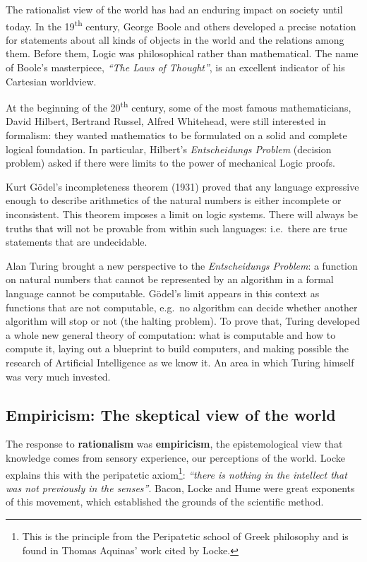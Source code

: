 The rationalist view of the world has had an enduring impact on society until today. In the 19\textsuperscript{th} century, George Boole and others developed a precise notation for statements about all kinds of objects in the world and the relations among them. Before them, Logic was philosophical rather than mathematical. The name of Boole's masterpiece, \emph{``The Laws of Thought''}, is an excellent indicator of his Cartesian worldview.

At the beginning of the 20\textsuperscript{th} century, some of the most famous mathematicians, David Hilbert, Bertrand Russel, Alfred Whitehead, were still interested in formalism: they wanted mathematics to be formulated on a solid and complete logical foundation. In particular, Hilbert's \textit{Entscheidungs Problem} (decision problem) asked if there were limits to the power of mechanical Logic proofs\cite{chaitin:2006}.

Kurt Gödel's incompleteness theorem (1931) proved that any language expressive enough to describe arithmetics of the natural numbers is either incomplete or inconsistent. This theorem imposes a limit on logic systems. There will always be truths that will not be provable from within such languages: i.e.\ there are true statements that are undecidable.

Alan Turing brought a new perspective to the \textit{Entscheidungs Problem}: a function on natural numbers that cannot be represented by an algorithm in a formal language cannot be computable\cite{chaitin:2006}. Gödel's limit appears in this context as functions that are not computable, e.g.\ no algorithm can decide whether another algorithm will stop or not (the halting problem). To prove that, Turing developed a whole new general theory of computation: what is computable and how to compute it, laying out a blueprint to build computers, and making possible the research of Artificial Intelligence as we know it. An area in which Turing himself was very much invested.

\subsection{Empiricism: The skeptical view of the world}

The response to \textbf{rationalism} was \textbf{empiricism}, the epistemological view that knowledge comes from sensory experience, our perceptions of the world. Locke explains this with the peripatetic axiom\footnote{This is the principle from the Peripatetic school of Greek philosophy and is found in Thomas Aquinas' work cited by Locke. }: \emph{``there is nothing in the intellect that was not previously in the senses''}\cite{williams:2020}. Bacon, Locke and Hume were great exponents of this movement, which established the grounds of the scientific method.

